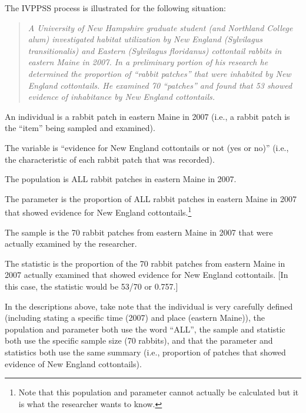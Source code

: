 \documentclass[10pt,openany]{book}\usepackage[]{graphicx}\usepackage[]{color}
\begin{document}
The IVPPSS process is illustrated for the following situation:
\vspace{-6pt}
\begin{quote}
\textit{A University of New Hampshire graduate student (and Northland College alum) investigated habitat utilization by New England (Sylvilagus transitionalis) and Eastern (Sylvilagus floridanus) cottontail rabbits in eastern Maine in 2007. In a preliminary portion of his research he determined the proportion of ``rabbit patches'' that were inhabited by New England cottontails. He examined 70 ``patches'' and found that 53 showed evidence of inhabitance by New England cottontails.}
\end{quote}
\vspace{-6pt}

\begin{Itemize}
  \item An individual is a rabbit patch in eastern Maine in 2007 (i.e., a rabbit patch is the ``item'' being sampled and examined).
  \item The variable is ``evidence for New England cottontails or not (yes or no)'' (i.e., the characteristic of each rabbit patch that was recorded).
  \item The population is ALL rabbit patches in eastern Maine in 2007.
  \item The parameter is the proportion of ALL rabbit patches in eastern Maine in 2007 that showed evidence for New England cottontails.\footnote{Note that this population and parameter cannot actually be calculated but it is what the researcher wants to know.}
  \item The sample is the 70 rabbit patches from eastern Maine in 2007 that were actually examined by the researcher.
  \item The statistic is the proportion of the 70 rabbit patches from eastern Maine in 2007 actually examined that showed evidence for New England cottontails. [In this case, the statistic would be 53/70 or 0.757.]
\end{Itemize}

In the descriptions above, take note that the individual is very carefully defined (including stating a specific time (2007) and place (eastern Maine)), the population and parameter both use the word ``ALL'', the sample and statistic both use the specific sample size (70 rabbits), and that the parameter and statistics both use the same summary (i.e., proportion of patches that showed evidence of New England cottontails).
\end{document}
